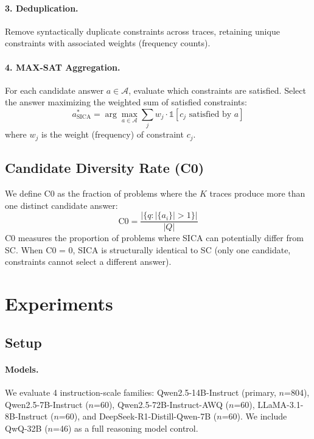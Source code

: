 \documentclass[11pt,a4paper]{article}
\begin{document}
\paragraph{3. Deduplication.} Remove syntactically duplicate constraints across traces, retaining unique constraints with associated weights (frequency counts).

\paragraph{4. MAX-SAT Aggregation.} For each candidate answer $a \in \mathcal{A}$, evaluate which constraints are satisfied. Select the answer maximizing the weighted sum of satisfied constraints:
\begin{equation}
a^*_{\text{SICA}} = \arg\max_{a \in \mathcal{A}} \sum_{j} w_j \cdot \mathbb{1}[c_j \text{ satisfied by } a]
\end{equation}
where $w_j$ is the weight (frequency) of constraint $c_j$.

\subsection{Candidate Diversity Rate (C0)}

We define C0 as the fraction of problems where the $K$ traces produce more than one distinct candidate answer:
\begin{equation}
\text{C0} = \frac{|\{q : |\{a_i\}| > 1\}|}{|Q|}
\end{equation}
C0 measures the proportion of problems where SICA can potentially differ from SC. When C0 = 0, SICA is structurally identical to SC (only one candidate, constraints cannot select a different answer).

\section{Experiments}

\subsection{Setup}

\paragraph{Models.} We evaluate 4 instruction-scale families: Qwen2.5-14B-Instruct (primary, $n$=804), Qwen2.5-7B-Instruct ($n$=60), Qwen2.5-72B-Instruct-AWQ ($n$=60), LLaMA-3.1-8B-Instruct ($n$=60), and DeepSeek-R1-Distill-Qwen-7B ($n$=60). We include QwQ-32B ($n$=46) as a full reasoning model control.
\end{document}
